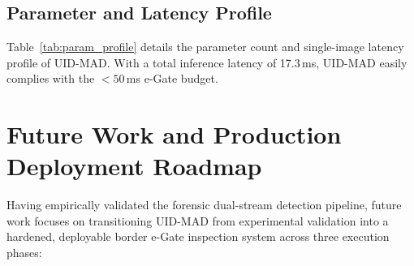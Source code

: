 \documentclass[11pt,a4paper]{article}
\begin{document}
\subsection{Parameter and Latency Profile}
Table~\ref{tab:param_profile} details the parameter count and single-image latency profile of UID-MAD. With a total inference latency of 17.3\,ms, UID-MAD easily complies with the $<50$\,ms e-Gate budget.

\begin{table}[h]
\centering
\caption{Parameter Count and Single-Image Inference Latency Profile (Dual NVIDIA T4 GPUs)}
\label{tab:param_profile}
\end{table}

\section{Future Work and Production Deployment Roadmap}
\label{sec:roadmap}

Having empirically validated the forensic dual-stream detection pipeline, future work focuses on transitioning UID-MAD from experimental validation into a hardened, deployable border e-Gate inspection system across three execution phases:
\end{document}
